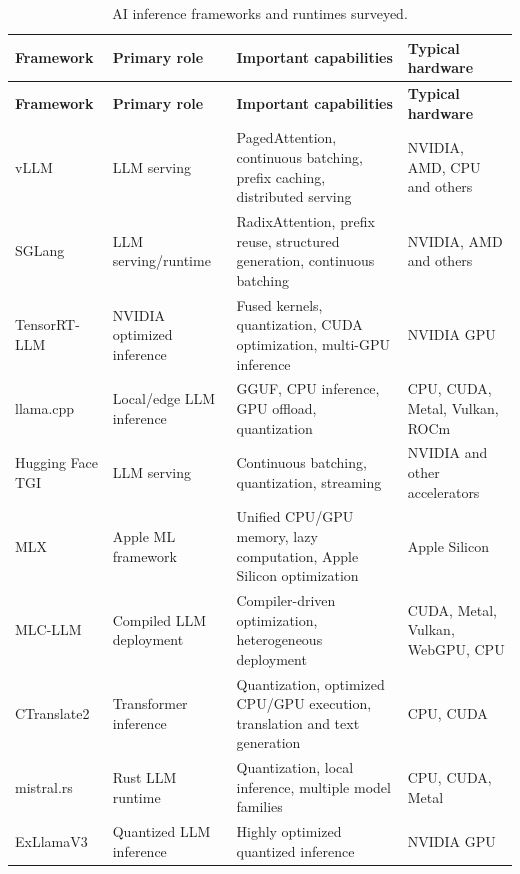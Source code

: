 \documentclass[11pt,a4paper]{article}
\begin{document}
\begin{longtable}{p{3.2cm} p{3.0cm} p{5.0cm} p{3.2cm}}
\caption{AI inference frameworks and runtimes surveyed.}\\
\toprule
\textbf{Framework} &
\textbf{Primary role} &
\textbf{Important capabilities} &
\textbf{Typical hardware} \\
\midrule
\endfirsthead

\toprule
\textbf{Framework} &
\textbf{Primary role} &
\textbf{Important capabilities} &
\textbf{Typical hardware} \\
\midrule
\endhead

vLLM &
LLM serving &
PagedAttention, continuous batching, prefix caching,
distributed serving &
NVIDIA, AMD, CPU and others \\

SGLang &
LLM serving/runtime &
RadixAttention, prefix reuse, structured generation,
continuous batching &
NVIDIA, AMD and others \\

TensorRT-LLM &
NVIDIA optimized inference &
Fused kernels, quantization, CUDA optimization,
multi-GPU inference &
NVIDIA GPU \\

llama.cpp &
Local/edge LLM inference &
GGUF, CPU inference, GPU offload, quantization &
CPU, CUDA, Metal, Vulkan, ROCm \\

Hugging Face TGI &
LLM serving &
Continuous batching, quantization, streaming &
NVIDIA and other accelerators \\

MLX &
Apple ML framework &
Unified CPU/GPU memory, lazy computation, Apple Silicon
optimization &
Apple Silicon \\

MLC-LLM &
Compiled LLM deployment &
Compiler-driven optimization, heterogeneous deployment &
CUDA, Metal, Vulkan, WebGPU, CPU \\

CTranslate2 &
Transformer inference &
Quantization, optimized CPU/GPU execution,
translation and text generation &
CPU, CUDA \\

mistral.rs &
Rust LLM runtime &
Quantization, local inference, multiple model families &
CPU, CUDA, Metal \\

ExLlamaV3 &
Quantized LLM inference &
Highly optimized quantized inference &
NVIDIA GPU \\


\end{longtable}
\end{document}
